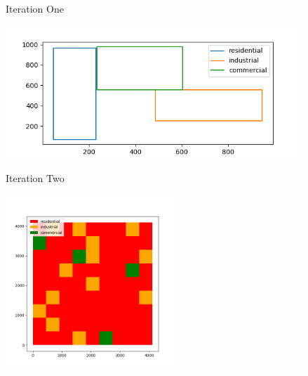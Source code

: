 \documentclass[10pt, aspectratio=169]{beamer}
\begin{document}
\begin{frame}[fragile]{Iteration One}
    \begin{center}
        \includegraphics[height=5cm, keepaspectratio]{images/first-zoning.png}
    \end{center}
\end{frame}

\begin{frame}[fragile]{Iteration Two}
    \begin{center}
        \includegraphics[height=6.6cm, keepaspectratio]{images/secondzoning.png}
    \end{center}
\end{frame}
\end{document}
